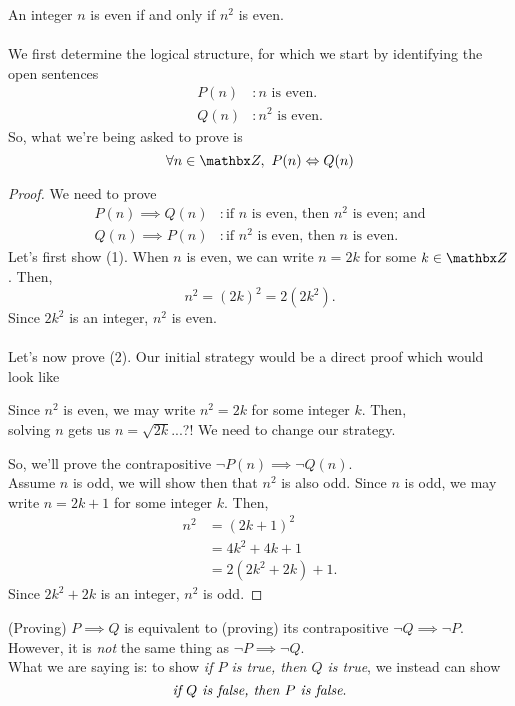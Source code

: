 \vspace*{1em}

\begin{example}
An integer $n$ is even if and only if $n^2$ is even.\\
\\
We first determine the logical structure, for which we start by identifying the open sentences
\begin{align*}
P(n)&: \text{$n$ is even.}\\
Q(n)&: \text{$n^2$ is even.}
\end{align*}
So, what we're being asked to prove is
\[\forall n \in \zz,\ P(n) \iff Q(n)\]
\end{example}
\begin{proof}
We need to prove
\begin{align*}
P(n) \implies Q(n) &: \text{if $n$ is even, then $n^2$ is even; and} \tag{1}\\[0.5em]
Q(n) \implies P(n) &: \text{if $n^2$ is even, then $n$ is even.} \tag{2}
\end{align*}
Let's first show (1). When $n$ is even, we can write $n = 2k$ for some $k \in \zz$. Then,
\[n^2 = (2k)^2 = 2(2k^2).\]
Since $2k^2$ is an integer, $n^2$ is even.\\
\\
Let's now prove (2). Our initial strategy would be a direct proof which would look like
\begin{center}
Since $n^2$ is even, we may write $n^2 = 2k$ for some integer $k$. Then,\\
solving $n$ gets us $n = \sqrt{2k}$...?! We need to change our strategy.
\end{center}
So, we'll prove the contrapositive $\neg P(n) \implies \neg Q(n)$.\\[0.5em]
Assume $n$ is odd, we will show then that $n^2$ is also odd. Since $n$ is odd, we may write $n = 2k + 1$ for some integer $k$. Then,
\begin{align*}
n^2 &= (2k + 1)^2\\
 &= 4k^2 + 4k + 1\\
 &= 2(2k^2 + 2k) + 1.
\end{align*}
Since $2k^2 + 2k$ is an integer, $n^2$ is odd. 
\end{proof}

\vspace*{1em}

\begin{remark}
(Proving) $P \implies Q$ is equivalent to (proving) its contrapositive $\neg Q \implies \neg P$. However, it is \emph{not} the same thing as $\neg P \implies \neg Q$.\\[0.5em]
What we are saying is: to show \emph{if $P$ is true, then $Q$ is true}, we instead can show \[\text{\emph{if $Q$ is false, then $P$ is false}.}\]
\end{remark}

